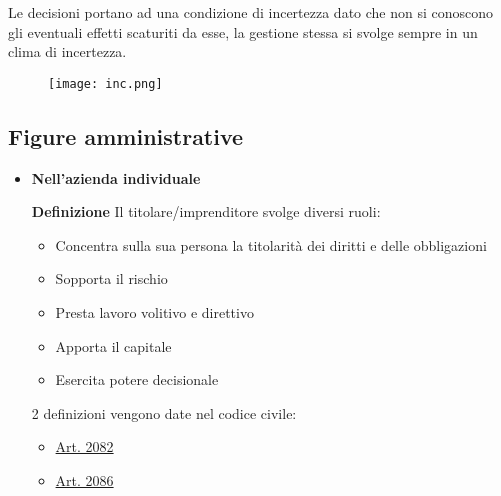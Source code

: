 \documentclass{article}
\newcommand{\df}{\noindent\textbf{Definizione }}
\begin{document}
\noindent Le decisioni portano ad una condizione di incertezza dato che non si conoscono gli eventuali effetti scaturiti da esse, la gestione stessa si svolge sempre in un clima di incertezza.\newline

\begin{figure}[ht]
    \centering
    \texttt{[image: inc.png]}
\end{figure}

\subsection{Figure amministrative}

\begin{itemize}
    \item \textbf{Nell'azienda individuale}

    \vspace{5pt}

    \df Il titolare/imprenditore svolge diversi ruoli:
        \begin{itemize}
            \item Concentra sulla sua persona la titolarità dei diritti e delle obbligazioni
            \item Sopporta il rischio
            \item Presta lavoro volitivo e direttivo
            \item Apporta il capitale
            \item Esercita potere decisionale
        \end{itemize}

    2 definizioni vengono date nel codice civile:
        \begin{itemize}
            \item \href{https://www.gazzettaufficiale.it/atto/serie_generale/caricaArticolo?art.versione=1&art.idGruppo=262&art.flagTipoArticolo=2&art.codiceRedazionale=042U0262&art.idArticolo=2082&art.idSottoArticolo=1&art.idSottoArticolo1=10&art.dataPubblicazioneGazzetta=1942-04-04&art.progressivo=0}{Art. 2082}
            \item \href{https://www.gazzettaufficiale.it/atto/serie_generale/caricaArticolo?art.versione=2&art.idGruppo=262&art.flagTipoArticolo=2&art.codiceRedazionale=042U0262&art.idArticolo=2086&art.idSottoArticolo=1&art.idSottoArticolo1=10&art.dataPubblicazioneGazzetta=1942-04-04&art.progressivo=0}{Art. 2086}\newline
        \end{itemize}


\end{itemize}
\end{document}
